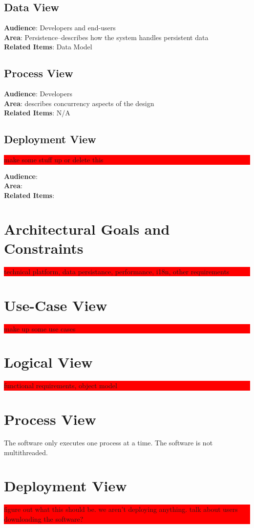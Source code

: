 \documentclass{article}
\newcommand{\todo}[1]{\colorbox{red}{\begin{minipage}{\textwidth}{#1}\end{minipage}}}
\begin{document}
\subsection{Data View}
\textbf{Audience}: Developers and end-users\\
\textbf{Area}: Persistence--describes how the system handles persistent data\\
\textbf{Related Items}: Data Model
\subsection{Process View}
\textbf{Audience}: Developers\\
\textbf{Area}: describes concurrency aspects of the design\\
\textbf{Related Items}: N/A
\subsection{Deployment View}
\todo{make some stuff up or delete this}
\textbf{Audience}:\\
\textbf{Area}:\\
\textbf{Related Items}:

\section{Architectural Goals and Constraints}
\todo{technical platform, data persistance, performance, i18n, other requirements}

\section{Use-Case View}
\todo{make up some use cases}

\section{Logical View}
\todo{functional requirements, object model}

\section{Process View}
The software only executes one process at a time. The software is not multithreaded.

\section{Deployment View}
\todo{figure out what this should be. we aren't deploying anything. talk about users downloading the software?}
\end{document}
